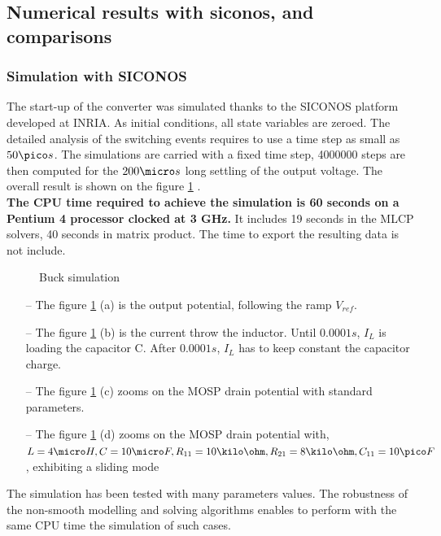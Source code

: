 \documentclass{article}
\begin{document}
\subsection{Numerical results with {\sc siconos},  and comparisons}
\label{section42}
\subsubsection{Simulation with SICONOS}
 The start-up of the converter was simulated thanks to the SICONOS platform
developed at INRIA. As initial conditions, all state variables are zeroed.
The detailed analysis of the switching events requires to use a time step as
small as $50 \pico s$. The simulations are carried with a fixed time step, 4000000 steps
are then computed for the $200 \micro s$ long settling of the output voltage.
The overall result is shown on the figure \ref{fig:figSimuBuck} .\\
\textbf{The CPU time required to achieve the simulation is 60 seconds on a
Pentium 4 processor clocked at 3 GHz.} It includes 19 seconds in the MLCP solvers, 40 seconds in
matrix product. The time to export the resulting data is not include.
\begin{figure}[h]
  \centering
   \scalebox{0.6}{
  
  }
  \caption{Buck simulation}
  \label{fig:figSimuBuck}
\end{figure}

\begin{enumerate}
  \item[--] The figure \ref{fig:figSimuBuck} (a) is the output potential, following the ramp $V_{ref}$.
    \item[--] The figure \ref{fig:figSimuBuck} (b) is the current throw the inductor. Until $0.0001s$, $I_L$
    is loading the capacitor C. After $0.0001s$, $I_L$ has to keep constant the capacitor charge.
    \item[--] The figure \ref{fig:figSimuBuck} (c) zooms on the MOSP drain potential with standard
    parameters.
    \item[--] The figure  \ref{fig:figSimuBuck} (d) zooms on the MOSP drain potential with, $L=4\micro H,
    C=10\micro F,
    R_{11}=10\kilo \ohm, R_{21}=8\kilo \ohm ,C_{11}=10\pico F$, exhibiting a
    sliding mode 
  \end{enumerate}

The simulation has been tested with many parameters values. The robustness of the non-smooth modelling and solving algorithms enables to perform with the same
CPU time the simulation of such cases. 
\end{document}
